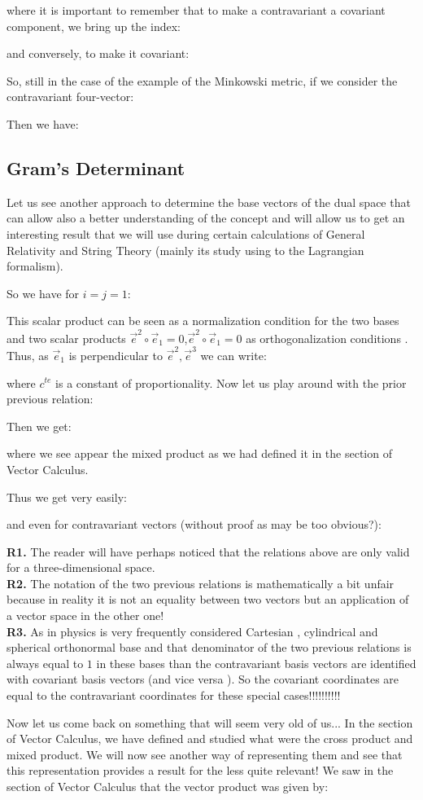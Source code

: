 	where it is important to remember that to make a contravariant a covariant  component, we bring up the index:
	
	and conversely, to make it covariant:
	
	So, still in the case of the example of the Minkowski metric, if we consider the contravariant four-vector:
	
	Then we have:
	
	
	\subsection{Gram's Determinant}
	Let us see another approach to determine the base vectors of the dual space that can allow also a better understanding of the concept and will allow us to get an interesting result that we will use during certain calculations of General Relativity and String Theory (mainly its study using to the Lagrangian formalism).
	
	So we have for $i=j=1$:
	
	This scalar product can be seen as a normalization condition for the two bases and two scalar products $\vec{e}^2\circ\vec{e}_1=0$,$\vec{e}^2\circ\vec{e}_1=0$ as orthogonalization conditions . Thus, as $\vec{e}_1$ is perpendicular to $\vec{e}^2,\vec{e}^3$ we can write:
	
	where $c^{te}$ is a constant of proportionality. Now let us play around with the prior previous relation:
	
	Then we get:
	
	where we see appear the mixed product as we had defined it in the section of Vector Calculus.
	
	Thus we get very easily:
	
	and even for contravariant vectors (without proof as may be too obvious?):
	
	\begin{tcolorbox}[title=Remarks,colframe=black,arc=10pt]
	\textbf{R1.} The reader will have perhaps noticed that the relations above are only valid for a three-dimensional space.\\
	
	\textbf{R2.} The notation of the two previous relations is mathematically a bit unfair because in reality it is not an equality between two vectors but an application of a vector space in the other one!\\
	
	\textbf{R3.} As in physics is very frequently considered Cartesian , cylindrical and spherical orthonormal base and that denominator of the two previous relations is always equal to $1$ in these bases than the contravariant basis vectors are identified with covariant basis vectors (and vice versa ). So the covariant coordinates are equal to the contravariant coordinates for these special cases!!!!!!!!!! 
	\end{tcolorbox}	
	Now let us come back on something that will seem very old of us... In the section of Vector Calculus, we have defined and studied what were the cross product and mixed product. We will now see another way of representing them and see that this representation provides a result for the less quite relevant!
	We saw in the section of Vector Calculus that the vector product was given by:
	
